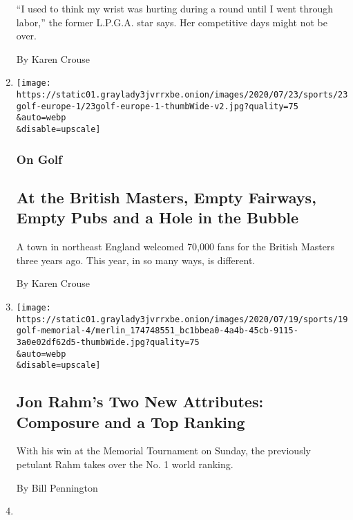 \begin{enumerate}
  ``I used to think my wrist was hurting during a round until I went
  through labor,'' the former L.P.G.A. star says. Her competitive days
  might not be over.

  By Karen Crouse
\item
  \href{/2020/07/23/sports/golf/british-masters-newcastle-wylam.html}{}

  \texttt{[image: https://static01.graylady3jvrrxbe.onion/images/2020/07/23/sports/23golf-europe-1/23golf-europe-1-thumbWide-v2.jpg?quality=75\\\&auto=webp\\\&disable=upscale]}

  \hypertarget{on-golf}{%
  \subsubsection{On Golf}\label{on-golf}}

  \hypertarget{at-the-british-masters-empty-fairways-empty-pubs-and-a-hole-in-the-bubble}{%
  \subsection{At the British Masters, Empty Fairways, Empty Pubs and a
  Hole in the
  Bubble}\label{at-the-british-masters-empty-fairways-empty-pubs-and-a-hole-in-the-bubble}}

  A town in northeast England welcomed 70,000 fans for the British
  Masters three years ago. This year, in so many ways, is different.

  By Karen Crouse
\item
  \href{/2020/07/19/sports/golf/jon-rahm-penalty-memorial-tournament-score.html}{}

  \texttt{[image: https://static01.graylady3jvrrxbe.onion/images/2020/07/19/sports/19golf-memorial-4/merlin\_174748551\_bc1bbea0-4a4b-45cb-9115-3a0e02df62d5-thumbWide.jpg?quality=75\\\&auto=webp\\\&disable=upscale]}

  \hypertarget{jon-rahms-two-new-attributes-composure-and-a-top-ranking}{%
  \subsection{Jon Rahm's Two New Attributes: Composure and a Top
  Ranking}\label{jon-rahms-two-new-attributes-composure-and-a-top-ranking}}

  With his win at the Memorial Tournament on Sunday, the previously
  petulant Rahm takes over the No. 1 world ranking.

  By Bill Pennington
\item
  \href{/2020/07/17/sports/golf/tiger-woods-memorial-tournament-score.html}{}


\end{enumerate}
